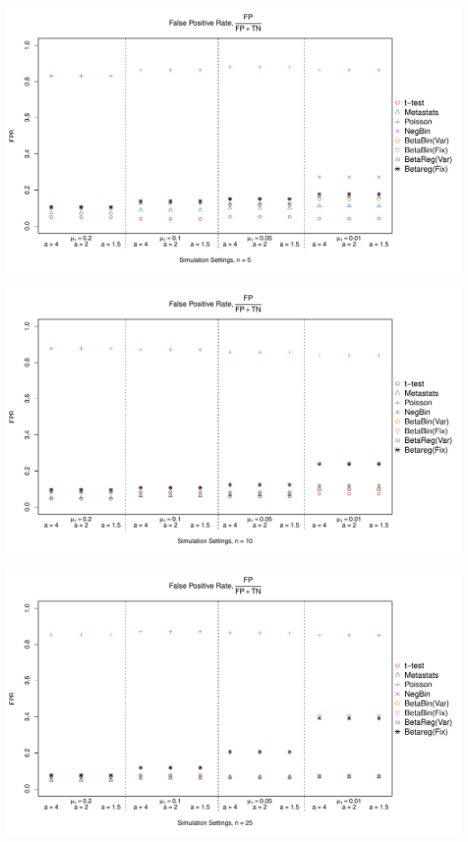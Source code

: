 \documentclass[12pt]{article}\usepackage{graphicx, color}
\makeatletter
\def\maxwidth{ %
  \ifdim\Gin@nat@width>\linewidth
    \linewidth
  \else
    \Gin@nat@width
  \fi
}
\newenvironment{knitrout}{}{} %
\makeatother
\begin{document}
\begin{knitrout}
{}




{\centering \includegraphics[width=\maxwidth]{figure/panelPlots4} 

}




{\centering \includegraphics[width=\maxwidth]{figure/panelPlots5} 

}




{\centering \includegraphics[width=\maxwidth]{figure/panelPlots6} 

}
\end{knitrout}
\end{document}
